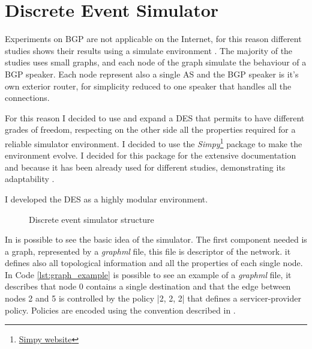 \chapter{Discrete Event Simulator}
\label{cha:des}

Experiments on \ac{BGP} are not applicable on the Internet, for this
reason different studies shows their results using a simulate environment
\cite{griffin2001experimental} .
The majority of the studies uses small graphs, and each node 
of the graph simulate the behaviour of a \ac{BGP} speaker.
Each node represent also a single \ac{AS} and the \ac{BGP} speaker is it's own
exterior router, for simplicity reduced to one speaker that handles all the
connections.
 
For this reason I decided to use and expand a \ac{DES} that permits to have
different grades of freedom, respecting on the other side all the properties
required for a reliable simulator environment.
I decided to use the \textit{Simpy}\footnote{\href{https://simpy.readthedocs.io/en/latest/index.html}{Simpy website}}
package to make the environment evolve. I decided for this package for the
extensive documentation and because it has been already used for different
studies, demonstrating its adaptability \cite{matloff2008introduction,dagkakis2013manpy}.

I developed the \ac{DES} as a highly modular environment.
\begin{figure}[h]                                                               
    \begin{center}                                                              
        
    \end{center}                                                                
    \caption{Discrete event simulator structure}                                
    \label{fig:des_structure}                                                   
\end{figure}
In  is possible to see the basic idea of the simulator.
The first component needed is a graph, represented by a \textit{graphml} file, this file is 
descriptor of the network. it defines also all topological information and all the
properties of each single node.
In Code \ref{lst:graph_example} is possible to see an example of a \textit{graphml} file,
it describes that node \num{0} contains a single destination and that the edge
between nodes \num{2} and \num{5} is controlled by the policy |2, 2, 2| that defines
a servicer-provider policy.
Policies are encoded using the convention described in \cite{daggitt2018rate}.

